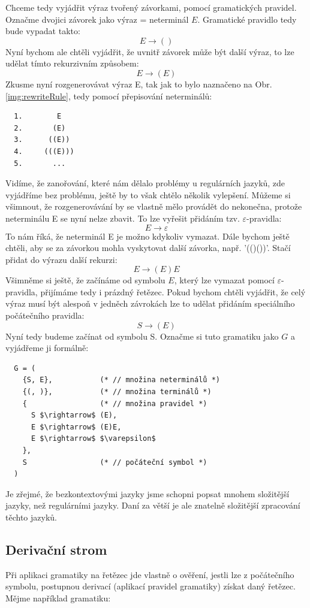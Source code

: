 Chceme tedy vyjádřit výraz tvořený závorkami, pomocí gramatických pravidel.
Označme dvojici závorek jako výraz = neterminál $E$. Gramatické pravidlo tedy bude
vypadat takto:
\[E \rightarrow ()\]
Nyní bychom ale chtěli vyjádřit, že uvnitř závorek může být další výraz, to
lze udělat tímto rekurzivním způsobem:
\[E \rightarrow (E)\]
Zkusme nyní rozgenerovávat výraz E, tak jak to bylo naznačeno na Obr. \ref{img:rewriteRule},
tedy pomocí přepisování neterminálů:
\begin{lstlisting}
  1.        E
  2.       (E)
  3.      ((E))
  4.     (((E)))
  5.       ...
\end{lstlisting}
Vidíme, že zanořování, které nám dělalo problémy u regulárních jazyků, zde vyjádříme bez problému,
ještě by to však chtělo několik vylepšení.
Můžeme si všimnout, že rozgenerovávání by se vlastně mělo provádět do nekonečna,
protože neterminálu E se nyní nelze zbavit. To lze vyřešit přidáním tzv.
$\varepsilon$-pravidla:
\[E \rightarrow \varepsilon\]
To nám říká, že neterminál E je možno kdykoliv vymazat. Dále bychom ještě chtěli,
aby se za závorkou mohla vyskytovat další závorka, např. '(()())'.
Stačí přidat do výrazu další rekurzi:
\[E \rightarrow (E)E\]
Všimněme si ještě, že začínáme od symbolu $E$, který lze vymazat pomocí
$\varepsilon$-pravidla, přijímáme tedy i prázdný řetězec. Pokud bychom chtěli
vyjádřit, že celý výraz musí být alespoň v jedněch závrokách lze to udělat
přidáním speciálního počátečního pravidla:
\[S \rightarrow (E)\]
Nyní tedy budeme začínat od symbolu S. Označme si tuto gramatiku jako
$G$ a vyjádřeme ji formálně:

\begin{lstlisting}
  G = (
    {S, E},           (* // množina neterminálů *)
    {(, )},           (* // množina terminálů *)
    {                 (* // množina pravidel *)
      S $\rightarrow$ (E),
      E $\rightarrow$ (E)E,
      E $\rightarrow$ $\varepsilon$
    },
    S                 (* // počáteční symbol *)
  )
\end{lstlisting}

Je zřejmé, že bezkontextovými jazyky jsme schopni popsat mnohem
složitější jazyky, než regulárními jazyky. Daní za větší 
je ale znatelně složitější zpracování těchto jazyků.

\subsection{Derivační strom}
\label{subsec:derivationTree}
Při aplikaci gramatiky na řetězec jde vlastně o ověření,
jestli lze z počátečního symbolu,
postupnou derivací (aplikací pravidel gramatiky) získat daný řetězec.
Mějme například gramatiku:

